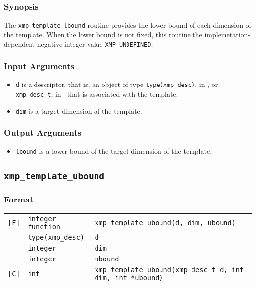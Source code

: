 \subsubsection*{Synopsis}

The {\tt xmp\_template\_lbound} routine provides the lower bound of each dimension of the template.
  When the lower bound is not fixed, this routine the implemetation-dependent negative integer value {\tt XMP\_UNDEFINED}. 

\subsubsection*{Input Arguments}
\begin{itemize}
 \item {\tt d} is a descriptor, that is, an object of type 
       {\tt type(xmp\_desc)}, in {\XMPF}, or {\tt xmp\_desc\_t},
       in {\XMPC}, that is associated with the template.
        \item {\tt dim} is a target dimension of the template.
\end{itemize}

\subsubsection*{Output Arguments}
\begin{itemize}
 \item {\tt lbound} is a lower bound of the target dimension of the template.
\end{itemize}


\subsection{\tt xmp\_template\_ubound}

\subsubsection*{Format}

\begin{tabular}{lll}

\verb![F]!& {\tt integer function}& {\tt xmp\_template\_ubound(d, dim, ubound)}\\
          & {\tt type(xmp\_desc)} & {\tt d}\\
          & {\tt integer} & {\tt dim}\\
          & {\tt integer} & {\tt ubound}\\

\verb![C]!&  {\tt int}& {\tt xmp\_template\_ubound(xmp\_desc\_t d, int dim, int *ubound)}\\

\end{tabular}

